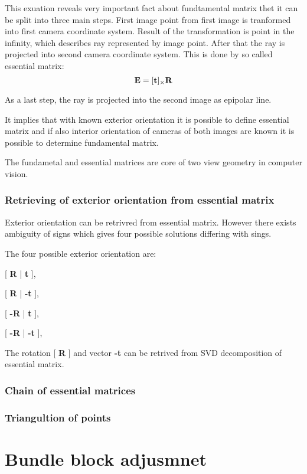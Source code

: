 \documentclass[a4paper,12pt]{report}
\newcommand{\ematr}[1]{
{\bf #1}
}
\newcommand{\evect}[1]{
{\bf #1}
}
\begin{document}
This exuation reveals very important fact about fundtamental matrix thet it can be split into three  main steps.
First image point from first image is tranformed into first camera coordinate system. Result of the transformation is 
point in the infinity, which describes ray represented by image point. 
After that the ray is projected into second camera coordinate system. This is done by so called essential matrix:
\begin{equation}
	 \ematr{E}  = [\evect{t}]_{\times} \ematr{R}
\end{equation}


As a last step, the ray is projected into the second image as epipolar line.


It implies that with known exterior orientation it is possible to define essential matrix and if also interior orientation of 
cameras of both images are known it is possible to determine fundamental matrix. 


The fundametal and essential matrices are core of two view geometry in computer vision.

\subsubsection{Retrieving of exterior orientation from essential matrix}

Exterior orientation can be retrivred from essential matrix. However there exists ambiguity of signs which gives 
four possible solutions differing with sings.

The four possible exterior orientation are:

[\ematr{R}|\evect{t}],

[\ematr{R}|\evect{-t}],

[\ematr{-R}|\evect{t}],

[\ematr{-R}|\evect{-t}],

The rotation [\ematr{R}] and vector \evect{-t} can be retrived from SVD decomposition of essential matrix.

\subsubsection{Chain of essential matrices}


\subsubsection{Triangultion of points}


\section{Bundle block adjusmnet}
\end{document}
